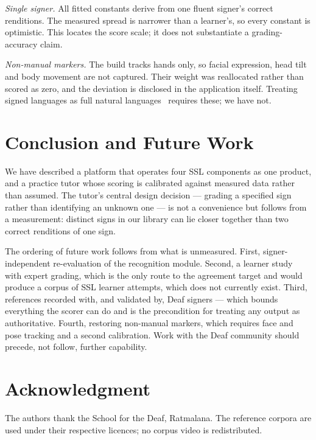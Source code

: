 \documentclass[conference]{IEEEtran}
\begin{document}
\emph{Single signer.} All fitted constants derive from one fluent signer's
correct renditions. The measured spread is narrower than a learner's, so every
constant is optimistic. This locates the score scale; it does not substantiate
a grading-accuracy claim.

\emph{Non-manual markers.} The build tracks hands only, so facial expression,
head tilt and body movement are not captured. Their weight was reallocated
rather than scored as zero, and the deviation is disclosed in the application
itself. Treating signed languages as full natural
languages~\cite{yin2021including} requires these; we have not.

\section{Conclusion and Future Work}

We have described a platform that operates four SSL components as one product,
and a practice tutor whose scoring is calibrated against measured data rather
than assumed. The tutor's central design decision --- grading a specified sign
rather than identifying an unknown one --- is not a convenience but follows
from a measurement: distinct signs in our library can lie closer together than
two correct renditions of one sign.

The ordering of future work follows from what is unmeasured. First,
signer-independent re-evaluation of the recognition module. Second, a learner
study with expert grading, which is the only route to the agreement target and
would produce a corpus of SSL learner attempts, which does not currently
exist. Third, references recorded with, and validated by, Deaf signers ---
which bounds everything the scorer can do and is the precondition for treating
any output as authoritative. Fourth, restoring non-manual markers, which
requires face and pose tracking and a second calibration. Work with the Deaf
community should precede, not follow, further capability.

\section*{Acknowledgment}
The authors thank the School for the Deaf, Ratmalana. The reference corpora
are used under their respective licences; no corpus video is redistributed.



\end{document}
